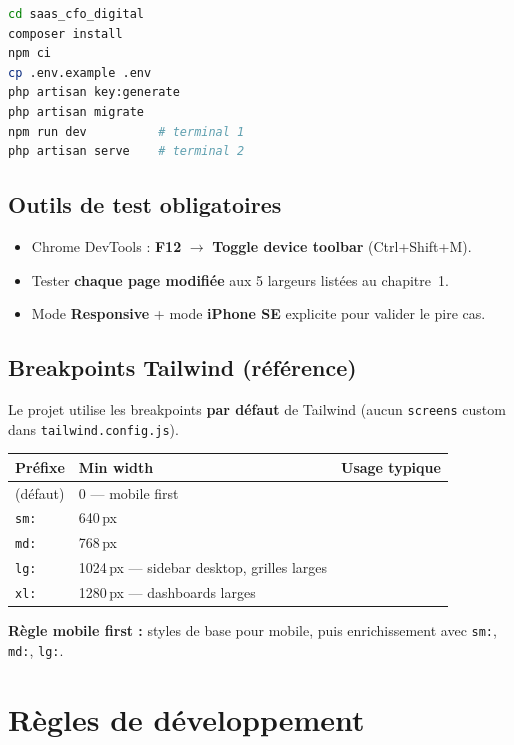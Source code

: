 \documentclass[11pt,a4paper]{report}
\newcommand{\filepath}[1]{\texttt{\small #1}}
\newcommand{\feat}[1]{\textbf{#1}}
\newcommand{\breakpoint}[2]{#1 & #2 \\}
\begin{document}
\begin{lstlisting}[language=bash]
cd saas_cfo_digital
composer install
npm ci
cp .env.example .env
php artisan key:generate
php artisan migrate
npm run dev          # terminal 1
php artisan serve    # terminal 2
\end{lstlisting}

\section{Outils de test obligatoires}

\begin{itemize}[leftmargin=1.5em]
    \item Chrome DevTools : \feat{F12} $\rightarrow$ \textbf{Toggle device toolbar} (Ctrl+Shift+M).
    \item Tester \textbf{chaque page modifiée} aux 5 largeurs listées au chapitre~1.
    \item Mode \textbf{Responsive} + mode \textbf{iPhone SE} explicite pour valider le pire cas.
\end{itemize}

\section{Breakpoints Tailwind (référence)}

Le projet utilise les breakpoints \textbf{par défaut} de Tailwind (aucun \texttt{screens} custom dans \filepath{tailwind.config.js}).

\begin{center}
\begin{tabular}{@{}lll@{}}
\toprule
\textbf{Préfixe} & \textbf{Min width} & \textbf{Usage typique} \\
\midrule
\breakpoint{(défaut)}{0 — mobile first}
\breakpoint{\texttt{sm:}}{640\,px}
\breakpoint{\texttt{md:}}{768\,px}
\breakpoint{\texttt{lg:}}{1024\,px — sidebar desktop, grilles larges}
\breakpoint{\texttt{xl:}}{1280\,px — dashboards larges}
\bottomrule
\end{tabular}
\end{center}

\textbf{Règle mobile first :} styles de base pour mobile, puis enrichissement avec \texttt{sm:}, \texttt{md:}, \texttt{lg:}.

\chapter{Règles de développement}
\end{document}
